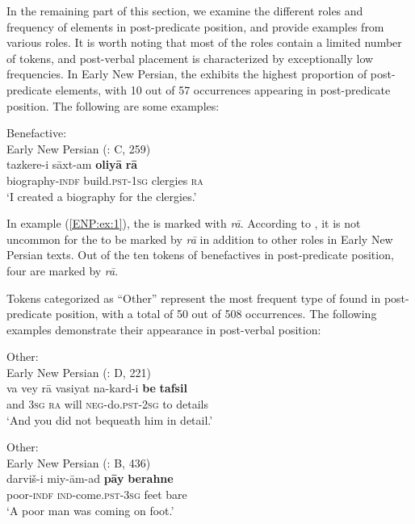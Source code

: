 \documentclass[output=paper,colorlinks,citecolor=brown,draftmode]{langscibook}
\begin{document}
In the remaining part of this section, we examine the different roles and frequency of elements in post-predicate position, and provide examples from various roles. It is worth noting that most of the roles contain a limited number of tokens, and post-verbal placement is characterized by exceptionally low frequencies. In Early New Persian, the   exhibits the highest proportion of post-predicate elements, with 10 out of 57 occurrences appearing in post-predicate position. The following are some examples: 

\ea\label{ENP:ex:1}
Benefactive: \\
Early New Persian (\citealt{parizadeh_persian_2022}: C, 259) \\
\gll tazkere-i sāxt-am \textbf{oliyā} \textbf{rā} \\
biography\textsc{-indf} build\textsc{.pst-1sg} clergies \textsc{ra} \\
\glt `I created a biography for the clergies.'
\z

\begin{sloppypar}
In example (\ref{ENP:ex:1}), the  is marked with \textit{rā}. According to \citet{rasekh-mahand2024different}, it is not uncommon for the   to be marked by \textit{rā} in addition to other roles in Early New Persian texts. Out of the ten tokens of benefactives in post-predicate position, four are marked by \textit{rā}. 
\end{sloppypar}

Tokens categorized as ``Other'' represent the most frequent type of  found in post-predicate position, with a total of 50 out of 508 occurrences. The following examples demonstrate their appearance in post-verbal position:

\ea\label{ENP:ex:2}
Other: \\
Early New Persian (\citealt{parizadeh_persian_2022}: D, 221) \\
\gll va vey rā vasiyat na-kard-i \textbf{be} \textbf{tafsil} \\
and \textsc{3sg} \textsc{ra} will \textsc{neg-}do\textsc{.pst-2sg} to details \\
\glt `And you did not bequeath him in detail.'
\z

\ea\label{ENP:ex:3}
Other: \\
Early New Persian (\citealt{parizadeh_persian_2022}: B, 436) \\
\gll darviš-i miy-ām-ad \textbf{pāy} \textbf{berahne} \\
poor\textsc{-indf} \textsc{ind-}come\textsc{.pst-3sg} feet bare \\
\glt `A poor man was coming on foot.' 
\z
\end{document}
